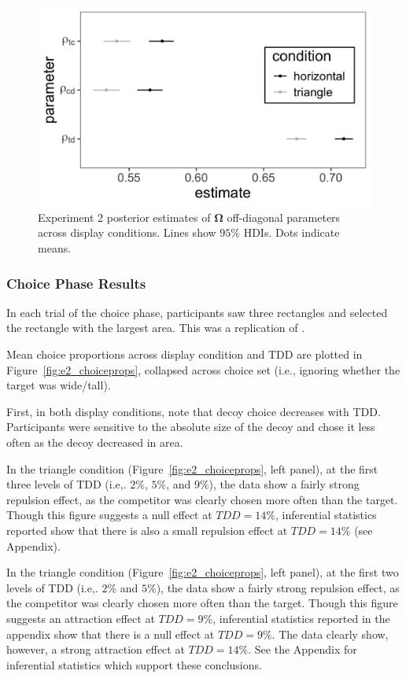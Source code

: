 \begin{figure}
   \includegraphics[width=130mm]{figures/bayes_circle_area_sigma_constant_comp_effect_omega_plot.jpeg}
   \caption{Experiment 2 posterior estimates of $\boldsymbol{\Omega}$ off-diagonal parameters across display conditions. Lines show $95\%$ HDIs. Dots indicate means.}
   \label{fig:e2_omega}
\end{figure}

\subsubsection{Choice Phase Results}

In each trial of the choice phase, participants saw three rectangles and selected the rectangle with the largest area. This was a replication of \textcite{spektorWhenGoodLooks2018b}.

Mean choice proportions across display condition and TDD are plotted in Figure~\ref{fig:e2_choiceprops}, collapsed across choice set (i.e., ignoring whether the target was wide/tall). 

First, in both display conditions, note that decoy choice decreases with TDD. Participants were sensitive to the absolute size of the decoy and chose it less often as the decoy decreased in area. 

In the triangle condition (Figure~\ref{fig:e2_choiceprops}, left panel), at the first three levels of TDD (i.e,. $2\%$, $5\%$, and $9\%$), the data show a fairly strong repulsion effect, as the competitor was clearly chosen more often than the target. Though this figure suggests a null effect at $TDD=14\%$, inferential statistics reported show that there is also a small repulsion effect at $TDD=14\%$ (see Appendix). 

In the triangle condition (Figure~\ref{fig:e2_choiceprops}, left panel), at the first two levels of TDD (i.e,. $2\%$ and $5\%$), the data show a fairly strong repulsion effect, as the competitor was clearly chosen more often than the target. Though this figure suggests an attraction effect at $TDD=9\%$, inferential statistics reported in the appendix show that there is a null effect at $TDD=9\%$. The data clearly show, however, a strong attraction effect at $TDD=14\%$. See the Appendix for inferential statistics which support these conclusions.

